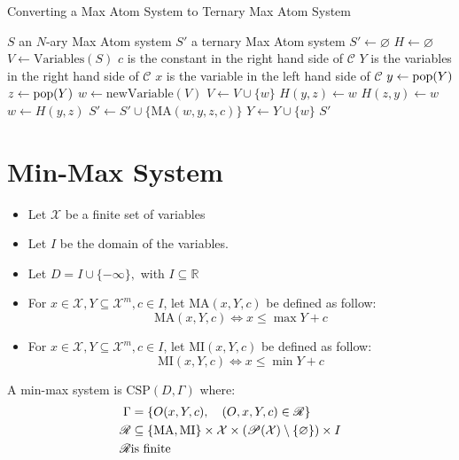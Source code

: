 \begin{algorithm}
	\caption{Converting a Max Atom System to Ternary Max Atom System}\label{alg:MaxAtomToTernaryMaxAtom}
	\begin{algorithmic}
		\Require $S$ an $N$-ary Max Atom system
		\Ensure $S'$ a ternary Max Atom system  
		\State $S'\leftarrow \varnothing$
		\State $H\leftarrow\varnothing$ 
		\State $V\leftarrow \text{Variables}(S)$  
		\State $c$ is the constant in the right hand side of $\mathcal{C}$
		\State $Y$ is the variables in the right hand side of $\mathcal{C}$
		\State $x$ is the variable in the left hand side of $\mathcal{C}$
				\State $y\leftarrow \operatorname{pop}(Y)$
				\State $z\leftarrow \operatorname{pop}(Y)$
					\State $w\leftarrow \text{newVariable}(V)$
					\State $V\leftarrow V\cup\{w\}$
					\State $H(y,z)\leftarrow w$
					\State $H(z,y)\leftarrow w$
				\EndIf
				\State $w\leftarrow H(y,z)$
				\State $S'\leftarrow S'\cup\{\text{MA}(w,y,z,c)\}$
				\State $Y\leftarrow Y\cup\{w\}$
			\EndWhile
		\EndFor
		\State \Return $S'$
	\end{algorithmic}
\end{algorithm}

\section{Min-Max System}

\begin{itemize}
	\item Let $\mathcal{X}$ be a finite set of variables
	\item Let $I$ be the domain of the variables.
	\item Let $D=I\cup \{-\infty\},$ with $I\subseteq \mathbb{R}$  
	\item For $x\in \mathcal{X},Y\subseteq\mathcal{X}^m,c\in I$, let $\text{MA}(x,Y,c)$ be defined as follow:
	$$
	\text{MA}(x,Y,c)\iff x\le \max Y+c
	$$
	\item For $x\in \mathcal{X},Y\subseteq\mathcal{X}^m,c\in I$, let $\text{MI}(x,Y,c)$ be defined as follow:
	$$
	\text{MI}(x,Y,c)\iff x\le \min Y+c
	$$
\end{itemize}

A min-max system is $\text{CSP}(D,\Gamma)$ where:
\begin{align*}
	\Gamma&=\left\{O(x,Y,c),\quad (O,x,Y,c)\in \mathscr{R}\right\}\\
	\mathscr{R}&\subseteq \{\text{MA},\text{MI}\}\times\mathcal{X}\times \left(\mathscr{P}(\mathcal{X}) \setminus \{\varnothing\}\right)\times I \\
	\mathscr{R}&\space \text{is finite}
\end{align*}


